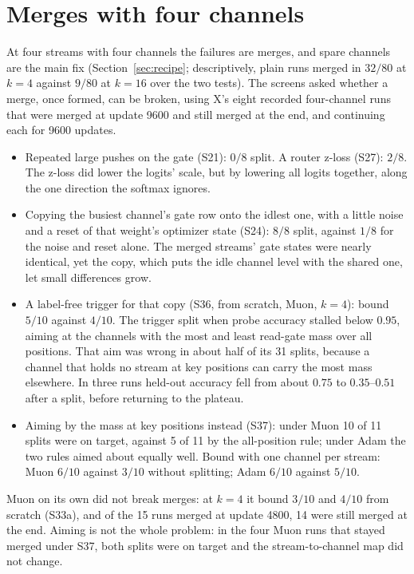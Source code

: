 \documentclass[11pt]{article}
\begin{document}
\section{Merges with four channels}
\label{sec:merge}

At four streams with four channels the failures are merges, and spare channels are the main fix (Section~\ref{sec:recipe}; descriptively, plain runs merged in $32/80$ at $k = 4$ against $9/80$ at $k = 16$ over the two tests). The screens asked whether a merge, once formed, can be broken, using X's eight recorded four-channel runs that were merged at update 9600 and still merged at the end, and continuing each for 9600 updates.

\begin{itemize}
\item Repeated large pushes on the gate (S21): $0/8$ split. A router z-loss \cite{stmoe} (S27): $2/8$. The z-loss did lower the logits' scale, but by lowering all logits together, along the one direction the softmax ignores.
\item Copying the busiest channel's gate row onto the idlest one, with a little noise and a reset of that weight's optimizer state (S24): $8/8$ split, against $1/8$ for the noise and reset alone. The merged streams' gate states were nearly identical, yet the copy, which puts the idle channel level with the shared one, let small differences grow.
\item A label-free trigger for that copy (S36, from scratch, Muon, $k = 4$): bound $5/10$ against $4/10$. The trigger split when probe accuracy stalled below $0.95$, aiming at the channels with the most and least read-gate mass over all positions. That aim was wrong in about half of its 31 splits, because a channel that holds no stream at key positions can carry the most mass elsewhere. In three runs held-out accuracy fell from about $0.75$ to $0.35$--$0.51$ after a split, before returning to the plateau.
\item Aiming by the mass at key positions instead (S37): under Muon 10 of 11 splits were on target, against 5 of 11 by the all-position rule; under Adam the two rules aimed about equally well. Bound with one channel per stream: Muon $6/10$ against $3/10$ without splitting; Adam $6/10$ against $5/10$.
\end{itemize}

\noindent
Muon on its own did not break merges: at $k = 4$ it bound $3/10$ and $4/10$ from scratch (S33a), and of the 15 runs merged at update 4800, 14 were still merged at the end. Aiming is not the whole problem: in the four Muon runs that stayed merged under S37, both splits were on target and the stream-to-channel map did not change.
\end{document}
